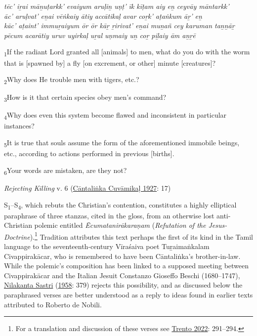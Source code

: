 \begin{pullquote}\raggedright
      \emph{tēc’ iṟai māṉuṭarkk’ evaiyum aruḷiṉ uṇṭ’ īk kīṭam aiy eṉ ceyvāy māntarkk’}\\
\emph{āc’ aruḷvat’ eṉai vēṅkaiy ātiy accātikaḷ avar coṟk’ aṭaṅkum āṟ’ eṉ}\\
\emph{kāc’ aṭaint’ immuṟaiyum ōr ōr kāṟ ṟirivat’ eṉai muṉañ cey karuman taṉṉāṟ}\\
\emph{pēcum acarātiy uruv uyirkaḷ uṟal uṇmaiy uṉ coṟ piḻaiy ām aṉṟē}
\end{pullquote}
      
\begin{pullquote}
\textsubscript{1}If the radiant Lord granted all [animals] to men, what do you do with the worm that is [spawned by] a fly [on excrement, or other] minute [creatures]? \medskip


\textsubscript{2}Why does He trouble men with tigers, etc.?\medskip


\textsubscript{3}How is it that certain species obey men’s command?\medskip


\textsubscript{4}Why does even this system become flawed and inconsistent in particular instances? \medskip


\textsubscript{5}It is true that souls assume the form of the aforementioned immobile beings, etc., according to actions performed in previous [births].\medskip


\textsubscript{6}Your words are mistaken, are they not?


\medskip\hfill\begin{minipage}{0.9\textwidth}\small\hfill
\emph{Rejecting Killing} v. 6  (\hyperref[CantalinkaCuvamikal1927]{Cāntaliṅka Cuvāmikaḷ 1927}: 17)\end{minipage}\hspace{2em}
\end{pullquote}

S\textsubscript{1}–S\textsubscript{4}, which rebuts the Christian’s contention, constitutes a highly elliptical paraphrase of three stanzas, cited in the gloss, from an otherwise lost anti-Christian polemic entitled \emph{{Ēcumatanirākaraṇam}} (\emph{Refutation of the Jesus-Doctrine}).\footnote{%
For a translation and discussion of these verses see \hyperref[Trento2022]{Trento 2022}: 291–294.
}
 Tradition attributes this text  \Dash  perhaps the first of its kind in the Tamil language  \Dash  to the seventeenth-century Vīraśaiva poet Tuṟaimaṅkalam Civappirakācar, who is remembered to have been Cāntaliṅka’s brother-in-law. While the polemic’s composition has been linked to a supposed meeting between Civappirakācar and the Italian Jesuit Constanzo Gioseffo Beschi (1680–1747), \hyperref[NilakantaSastri1958]{Nilakanta Sastri} (\hyperref[NilakantaSastri1958]{1958}: 379) rejects this possibility, and as discussed below the paraphrased verses are better understood as a reply to ideas found in earlier texts attributed to Roberto de Nobili. 


